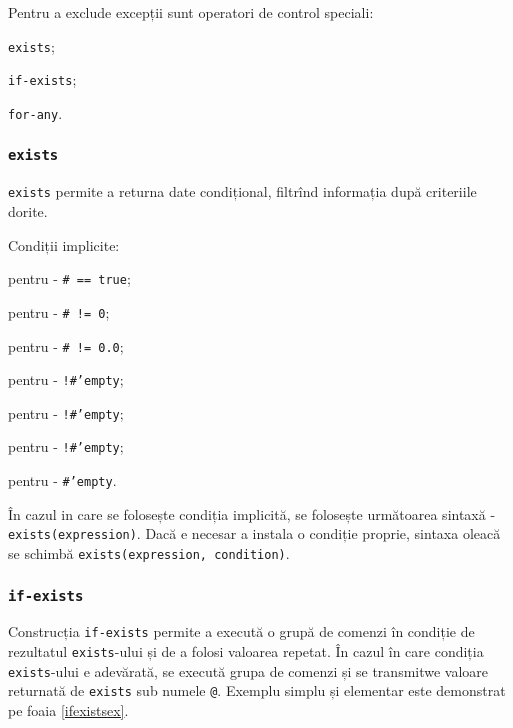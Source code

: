 Pentru a exclude excepții sunt operatori de control speciali:
\begin{icItems}
	\item \texttt{exists};
	\item \texttt{if-exists};
	\item \texttt{for-any}.
\end{icItems}

\subsubsection{\texttt{exists}}

\texttt{exists} permite a returna date condițional, filtrînd informația după criteriile dorite.

Condiții implicite:
\begin{icItems}
	\item
	pentru \bool{} - \texttt{# == true};
	\item
	pentru \integer{} - \texttt{# != 0};
	\item
	pentru \double{} - \texttt{# != 0.0};
	\item
	pentru \str{} - \texttt{!#'empty};
	\item
	pentru \listtype{} - \texttt{!#'empty};
	\item
	pentru \set{} - \texttt{!#'empty};
	\item
	pentru \element{} - \texttt{#'empty}.
\end{icItems}

În cazul in care se folosește condiția implicită, se folosește următoarea sintaxă - \texttt{exists(expression)}.
Dacă e necesar a instala o condiție proprie, sintaxa oleacă se schimbă \texttt{exists(expression, condition)}.

\subsubsection{\texttt{if-exists}}

Construcția \texttt{if-exists} permite a execută o grupă de comenzi în condiție de rezultatul \texttt{exists}-ului și de a folosi valoarea repetat. În cazul în care condiția \texttt{exists}-ului e adevărată, se execută grupa de comenzi și se transmitwe valoare returnată de \texttt{exists} sub numele \texttt{@}.
Exemplu simplu și elementar este demonstrat pe foaia \ref{ifexistsex}.

